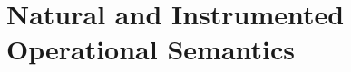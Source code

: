 \documentclass[acmsmall,review,anonymous,screen]{acmart}
\begin{document}





\appendix

\section{Natural and Instrumented Operational Semantics}\label{app:opsem}
\end{document}
